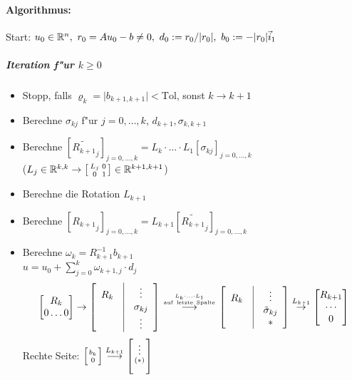 \documentclass{scrartcl}
\begin{document}
\paragraph*{Algorithmus:}
Start: $u_0 \in \mathbb{R}^n, \ r_0 = Au_0 - b \neq 0, \ d_0 := r_0 / \vert r_0 \vert, \ b_0 := - \vert r_0 \vert \vec i_1$
\subparagraph*{Iteration f"ur $k \geq 0$} 
\begin{itemize}
\item Stopp, falls $\varrho_k = \vert b_{k+1,k+1} \vert < \mathrm{Tol}$, sonst $k \rightarrow k+1$ 
\item Berechne $\sigma_{kj}$ f"ur $j=0,\ldots, k$, $d_{k+1}, \sigma_{k,k+1}$ 
\item Berechne ${\left[  \widetilde{{{R}}_{k+1}}_j \right]}_{j=0, \ldots, k} = L_k \cdot \ldots \cdot L_1 [ \sigma_{kj} ]_{j=0, \ldots, k}$ \\
($L_j \in \mathbb{R}^{k,k} \rightarrow \left[ \begin{smallmatrix} L_j & 0 \\ 0 & 1 \end{smallmatrix} \right] \in \mathbb{R}^{k+1,k+1}$)
\item Berechne die Rotation $L_{k+1}$
\item Berechne $[{R_{k+1}}_j]_{j=0,\ldots,k} = L_{k+1} [ \widetilde{{ R_{k+1}}}_j ]_{j=0,\ldots,k}$ 
\item Berechne $\omega_k = R_{k+1}^{-1} b_{k+1}$ \\
$u = u_0 + \sum\limits_{j=0}^k \omega_{k+1,j} \cdot d_j$ 
$$ \left[ \begin{matrix} R_k \\ 0 \ldots 0 \end{matrix} \right]
\rightarrow
\left[ \begin{array}{c c c} R_k & \vline & \vdots \\ & \vline & \sigma_{kj} \\ & \vline & \vdots \end{array} \right] \stackrel{\genfrac{}{}{0pt}{}{L_k \cdot \ldots \cdot L_1}{\mathrm{auf \ letzte \ Spalte}}}{\longrightarrow} \left[ \begin{array}{c c c} R_k & \vline & \vdots \\ & \vline & \tilde \sigma_{kj} \\ & \vline & * \end{array} \right] \stackrel{L_{k+1}}{\rightarrow} \left[ \begin{matrix} R_{k+1} \\ \cdots \\ 0 \end{matrix} \right]$$
Rechte Seite: $\left[ \genfrac{}{}{0pt}{}{b_k}{0} \right] \stackrel{L_{k+1}}{\longrightarrow} \left[ \genfrac{}{}{0pt}{}{\vdots}{(*)} \right]$
\end{itemize}
\end{document}
